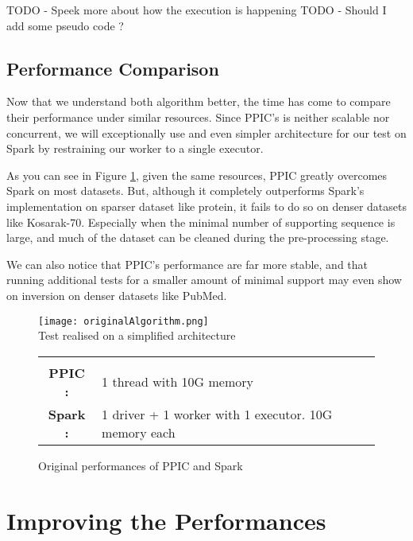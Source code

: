 \documentclass{eplmastersthesis}
\newcommand\danger{%
 \makebox[1.4em][c]{%
 \makebox[0pt][c]{\raisebox{.1em}{\small!}}%
 \makebox[0pt][c]{\color{red}\Large$\bigtriangleup$}}}%
\begin{document}
TODO - Speek more about how the execution is happening \newline
TODO - Should I add some pseudo code ?

\subsection{Performance Comparison}

Now that we understand both algorithm better, the time has come to compare their performance under similar resources. Since PPIC's is neither scalable nor concurrent, we will exceptionally use and even simpler architecture for our test on Spark by restraining our worker to a single executor. \newline

As you can see in Figure \ref{fig:originalAlgorithmPerformances}, given the same resources, PPIC greatly overcomes Spark on most datasets. But, although it completely outperforms Spark's implementation on sparser dataset like protein, it fails to do so on denser datasets like Kosarak-70. Especially when the minimal number of supporting sequence is large, and much of the dataset can be cleaned during the pre-processing stage. \newline

We can also notice that PPIC's performance are far more stable, and that running additional tests for a smaller amount of minimal support may even show on inversion on denser datasets like PubMed.\newline

\begin{figure}[h]
  \centering
  \texttt{[image: originalAlgorithm.png]} \\
  \danger  Test realised on a simplified architecture \danger \\
  \begin{tabular}{c l}
  	 & \\
  	\textbf{PPIC :} & 1 thread  with 10G memory \\
  	\textbf{Spark :} & 1 driver + 1 worker with 1 executor. 10G memory each
  \end{tabular}
  \caption{Original performances of PPIC and Spark}
  \label{fig:originalAlgorithmPerformances}
\end{figure}

\section{Improving the Performances}
\end{document}
